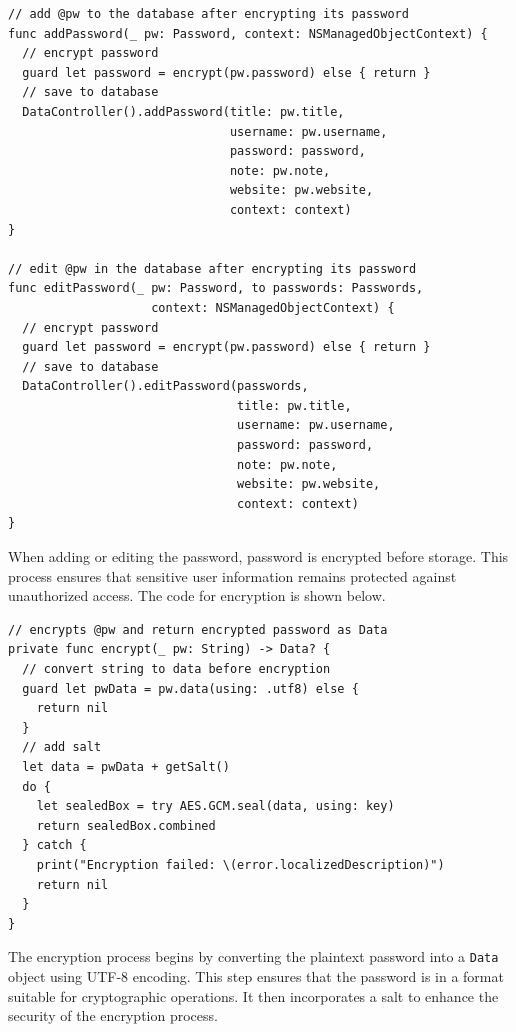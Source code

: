 \documentclass[10pt, titlepage]{article}
\begin{document}
\begin{center}
\begin{minipage}{\linewidth}
\begin{lstlisting}
// add @pw to the database after encrypting its password
func addPassword(_ pw: Password, context: NSManagedObjectContext) {
  // encrypt password
  guard let password = encrypt(pw.password) else { return }
  // save to database
  DataController().addPassword(title: pw.title,
                               username: pw.username,
                               password: password,
                               note: pw.note,
                               website: pw.website,
                               context: context)
}

// edit @pw in the database after encrypting its password
func editPassword(_ pw: Password, to passwords: Passwords, 
                    context: NSManagedObjectContext) {
  // encrypt password
  guard let password = encrypt(pw.password) else { return }
  // save to database
  DataController().editPassword(passwords,
                                title: pw.title,
                                username: pw.username,
                                password: password,
                                note: pw.note,
                                website: pw.website,
                                context: context)
}
\end{lstlisting}
\end{minipage}
\end{center}
When adding or editing the password, password is encrypted before storage. This process ensures that sensitive user information remains protected against unauthorized access. The code for encryption is shown below. 
\begin{center}
\begin{minipage}{\linewidth}
\begin{lstlisting}
// encrypts @pw and return encrypted password as Data
private func encrypt(_ pw: String) -> Data? {
  // convert string to data before encryption
  guard let pwData = pw.data(using: .utf8) else {
    return nil
  }
  // add salt
  let data = pwData + getSalt()
  do {
    let sealedBox = try AES.GCM.seal(data, using: key)
    return sealedBox.combined
  } catch {
    print("Encryption failed: \(error.localizedDescription)")
    return nil
  }
}
\end{lstlisting}
\end{minipage}
\end{center}
The encryption process begins by converting the plaintext password into a \texttt{Data} object using UTF-8 encoding. This step ensures that the password is in a format suitable for cryptographic operations. It then incorporates a salt to enhance the security of the encryption process.
\end{document}
